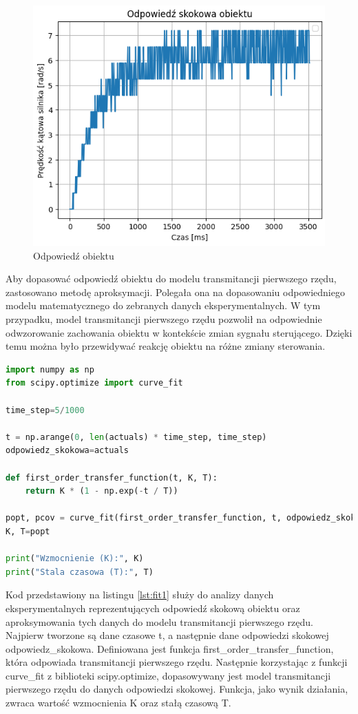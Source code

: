 \documentclass[12pt,twoside]{article}
\begin{document}
\begin{figure}[ht]%
 \centering%
 \includegraphics[width=12cm]{figures/PID/noreg.png}%
 \caption{Odpowiedź obiektu}%
 \label{Fig:noreg}%
\end{figure}

Aby dopasować odpowiedź obiektu do modelu transmitancji pierwszego rzędu, zastosowano metodę aproksymacji. Polegała ona na dopasowaniu odpowiedniego modelu matematycznego do zebranych danych eksperymentalnych. W tym przypadku, model transmitancji pierwszego rzędu pozwolił na odpowiednie odwzorowanie zachowania obiektu w kontekście zmian sygnału sterującego. Dzięki temu można było przewidywać reakcję obiektu na różne zmiany sterowania.

\begin{lstlisting}[language=Python, caption=Kod aproksymujący odpowiedź, label={lst:fit1}]
import numpy as np
from scipy.optimize import curve_fit

time_step=5/1000
  
t = np.arange(0, len(actuals) * time_step, time_step)
odpowiedz_skokowa=actuals 

def first_order_transfer_function(t, K, T):
    return K * (1 - np.exp(-t / T))

popt, pcov = curve_fit(first_order_transfer_function, t, odpowiedz_skokowa)
K, T=popt

print("Wzmocnienie (K):", K)
print("Stala czasowa (T):", T)
\end{lstlisting}

Kod przedstawiony na listingu \ref{lst:fit1} służy do analizy danych eksperymentalnych reprezentujących odpowiedź skokową obiektu oraz aproksymowania tych danych do modelu transmitancji pierwszego rzędu. Najpierw tworzone są dane czasowe t, a następnie dane odpowiedzi skokowej odpowiedz\_skokowa. Definiowana jest funkcja first\_order\_transfer\_function, która odpowiada transmitancji pierwszego rzędu. Następnie korzystając z funkcji curve\_fit z biblioteki scipy.optimize, dopasowywany jest model transmitancji pierwszego rzędu do danych odpowiedzi skokowej. Funkcja, jako wynik działania, zwraca wartość wzmocnienia K oraz stałą czasową T.
\end{document}
